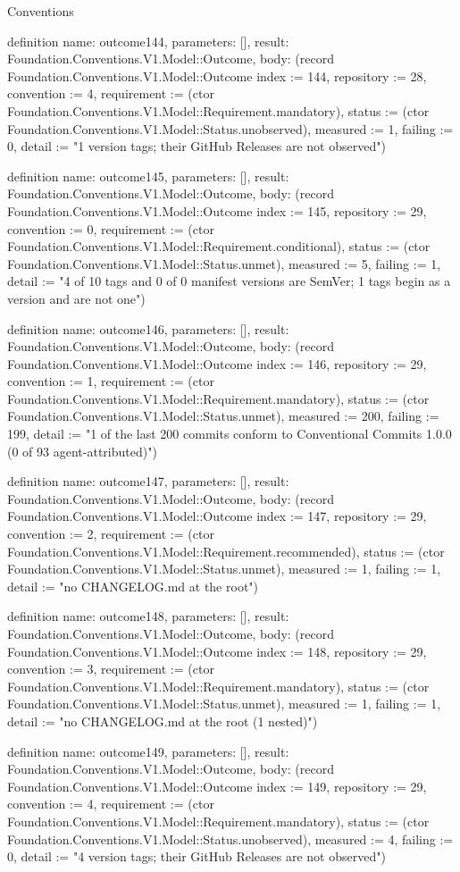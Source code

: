 \begin{lexlean}{Conventions}
\begin{semanticmodule}
definition{
  name: outcome144,
  parameters: [],
  result: Foundation.Conventions.V1.Model::Outcome,
  body: (record Foundation.Conventions.V1.Model::Outcome {index := 144, repository := 28, convention := 4, requirement := (ctor Foundation.Conventions.V1.Model::Requirement.mandatory), status := (ctor Foundation.Conventions.V1.Model::Status.unobserved), measured := 1, failing := 0, detail := "1 version tags; their GitHub Releases are not observed"})
}

definition{
  name: outcome145,
  parameters: [],
  result: Foundation.Conventions.V1.Model::Outcome,
  body: (record Foundation.Conventions.V1.Model::Outcome {index := 145, repository := 29, convention := 0, requirement := (ctor Foundation.Conventions.V1.Model::Requirement.conditional), status := (ctor Foundation.Conventions.V1.Model::Status.unmet), measured := 5, failing := 1, detail := "4 of 10 tags and 0 of 0 manifest versions are SemVer; 1 tags begin as a version and are not one"})
}

definition{
  name: outcome146,
  parameters: [],
  result: Foundation.Conventions.V1.Model::Outcome,
  body: (record Foundation.Conventions.V1.Model::Outcome {index := 146, repository := 29, convention := 1, requirement := (ctor Foundation.Conventions.V1.Model::Requirement.mandatory), status := (ctor Foundation.Conventions.V1.Model::Status.unmet), measured := 200, failing := 199, detail := "1 of the last 200 commits conform to Conventional Commits 1.0.0 (0 of 93 agent-attributed)"})
}

definition{
  name: outcome147,
  parameters: [],
  result: Foundation.Conventions.V1.Model::Outcome,
  body: (record Foundation.Conventions.V1.Model::Outcome {index := 147, repository := 29, convention := 2, requirement := (ctor Foundation.Conventions.V1.Model::Requirement.recommended), status := (ctor Foundation.Conventions.V1.Model::Status.unmet), measured := 1, failing := 1, detail := "no CHANGELOG.md at the root"})
}

definition{
  name: outcome148,
  parameters: [],
  result: Foundation.Conventions.V1.Model::Outcome,
  body: (record Foundation.Conventions.V1.Model::Outcome {index := 148, repository := 29, convention := 3, requirement := (ctor Foundation.Conventions.V1.Model::Requirement.mandatory), status := (ctor Foundation.Conventions.V1.Model::Status.unmet), measured := 1, failing := 1, detail := "no CHANGELOG.md at the root (1 nested)"})
}

definition{
  name: outcome149,
  parameters: [],
  result: Foundation.Conventions.V1.Model::Outcome,
  body: (record Foundation.Conventions.V1.Model::Outcome {index := 149, repository := 29, convention := 4, requirement := (ctor Foundation.Conventions.V1.Model::Requirement.mandatory), status := (ctor Foundation.Conventions.V1.Model::Status.unobserved), measured := 4, failing := 0, detail := "4 version tags; their GitHub Releases are not observed"})
}


\end{semanticmodule}
\end{lexlean}
